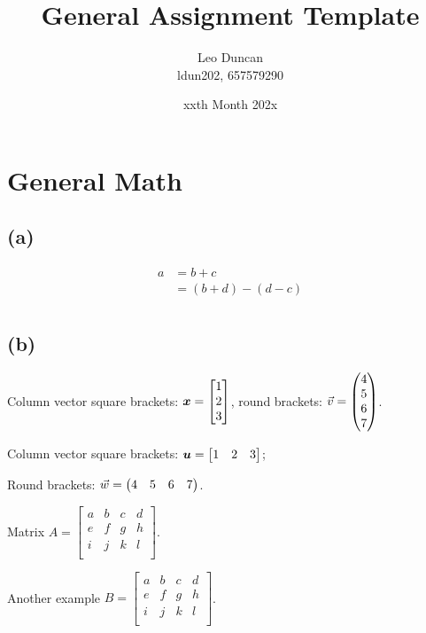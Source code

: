 \documentclass[11pt, a4paper]{article}
\title{General Assignment Template}
\author{Leo Duncan \\ ldun202, 657579290}
\date{xxth Month 202x}
\begin{document}
\maketitle

\section{General Math}

\subsection{(a)} %

\begin{equation*}
    \begin{split}
        a &= b + c \\
        &= (b + d) - (d - c) \\
    \end{split}
\end{equation*}

\subsection{(b)} %

Column vector square brackets: $\bm{x} = \begin{bmatrix}1\\2\\3\end{bmatrix}$, round brackets: $\vec{v} = \begin{pmatrix}4\\5\\6\\7\end{pmatrix}$.

Column vector square brackets: $\bm{u} = \begin{bmatrix}1&2&3\end{bmatrix}$;

Round brackets: $\vec{w} = \begin{pmatrix}4&5&6&7\end{pmatrix}$.

Matrix $A = \left[\begin{array}{cccc}
    a & b & c & d \\
    e & f & g & h \\
    i & j & k & l \\
\end{array}\right]$.

Another example $B = \left[\begin{array}{ccc|c}
    a & b & c & d \\
    e & f & g & h \\
    i & j & k & l \\
\end{array}\right]$.
\end{document}
